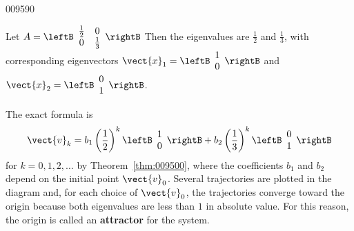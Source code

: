 \begin{example}{}{009590}
\begin{wrapfigure}[12]{l}{5cm} 
\centering

\end{wrapfigure}

\setlength{\rightskip}{0pt plus 200pt}
Let $A = \leftB \begin{array}{cc}
\frac{1}{2} & 0 \\
0 & \frac{1}{3}
\end{array}\rightB$
 Then the eigenvalues are $\frac{1}{2}$ and $\frac{1}{3}$, with corresponding eigenvectors $\vect{x}_1 = \leftB \begin{array}{r}
1\\
0
\end{array} \rightB$
 and $ \vect{x}_2 = \leftB \begin{array}{c}
0 \\
1
\end{array}\rightB$. 

 The exact formula is
\begin{equation*}
\vect{v}_k = b_1 \left( \frac{1}{2}\right)^k \leftB \begin{array}{r}
1 \\
0
\end{array}\rightB + b_2 \left( \frac{1}{3} \right)^k \leftB \begin{array}{r}
0 \\
1
\end{array} \rightB
\end{equation*}
for $k = 0, 1, 2, \dots $ by Theorem~\ref{thm:009500}, where the coefficients $b_{1}$ and $b_{2}$ depend on the initial point $\vect{v}_{0}$. 
Several trajectories are plotted in the diagram and, for each choice of $\vect{v}_{0}$,
 the trajectories converge toward the origin because both eigenvalues 
are less than $1$ in absolute value. For this reason, the origin is called
 an \textbf{attractor} for the system.
\end{example}

